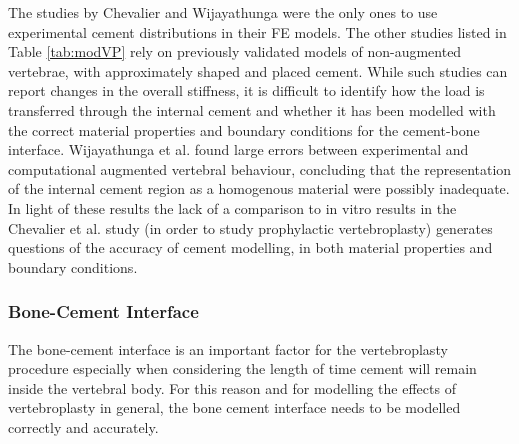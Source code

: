 The studies by Chevalier \cite{Chevalier2008} and Wijayathunga
\cite{Wijayathunga2008} were
the
only ones to use experimental cement distributions in their FE
models. The other studies listed in Table \ref{tab:modVP} rely on
previously validated
models of non-augmented vertebrae, with approximately shaped and placed
cement. While such studies can report changes in the overall stiffness,
it is difficult to identify how the load is transferred through the
internal cement and whether it has been modelled with the correct
material properties and boundary conditions for the cement-bone
interface. Wijayathunga et al. \cite{Wijayathunga2008} found large errors
between
experimental and computational augmented vertebral behaviour, concluding
that the representation of the internal cement region as a homogenous
material were possibly inadequate. In light of these results the lack of
a comparison to in vitro results in the Chevalier et al. \cite{Chevalier2008}
study
(in order to study prophylactic vertebroplasty) generates questions of
the accuracy of cement modelling, in both material properties and
boundary conditions.

\subsubsection{Bone-Cement Interface}\label{bone-cement-interface}

The bone-cement interface is an important factor for the vertebroplasty
procedure especially when considering the length of time cement will
remain inside the vertebral body. For this reason and for modelling the
effects of vertebroplasty in general, the bone cement interface needs to
be modelled correctly and accurately.

